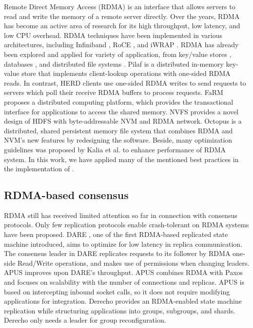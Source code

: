 Remote Direct Memory Access (RDMA) \cite{kalia2016design} is an interface that
allows servers to read and write the memory of a remote server directly. Over
the years, RDMA has become an active area of research for its high throughput,
low latency, and low CPU overhead. RDMA techniques have been implemented in
various architectures, including Infiniband \cite{pfister2001introduction}, RoCE
\cite{beck2011performance}, and iWRAP \cite{rashti200710}. RDMA has already been
explored and applied for variety of application, from key/value stores
\cite{FaRM, kalia2014using, mitchell2013using, wei2015fast}, databases
\cite{binnig2015end, huang2019rdma}, and distributed file systems
\cite{islam2012high, li2009early, wu2003pvfs}. Pilaf \cite{mitchell2013using} is
a distributed in-memory key-value store that implements client-lookup operations
with one-sided RDMA reads. In contrast, HERD \cite{kalia2014using} clients use
one-sided RDMA writes to send requests to servers which poll their receive RDMA
buffers to process requests. FaRM \cite{FaRM} proposes a distributed computing
platform, which provides the transactional interface for applications to access
the shared memory. NVFS \cite{islam2012high} provides a novel design of HDFS
with byte-addressable NVM and RDMA network. Octopus \cite{lu2017octopus} is a
distributed, shared persistent memory file system that combines RDMA and NVM's
new features by redesigning the software. Beside, many optimization guidelines
was proposed by Kalia et al. \cite{kalia2016design} to enhance performance of
RDMA system. In this work, we have applied many of the mentioned best practices
in the implementation of \libname.


\subsection{RDMA-based consensus}
\label{sec:rwrdmacons}

RDMA still has received limited attention so far in connection with consensus
protocols. Only few replication protocols enable crash-tolerant on RDMA systems
have been proposed. DARE \cite{DARE}, one of the first RDMA-based replicated
state machine introduced, aims to optimize for low latency in replica
communication. The consensus leader in DARE replicates requests to its follower
by RDMA one-side Read/Write operations, and makes use of permissions when
changing leaders. APUS \cite{APUS} improves upon DARE’s throughput. APUS
combines RDMA with Paxos and focuses on scalability with the number of
connections and replicas. APUS is based on intercepting inbound socket calls, so
it does not require modifying applications for integration. Derecho
\cite{jha2019derecho} provides an RDMA-enabled state machine replication while
structuring applications into groups, subgroups, and shards. Derecho only needs
a leader for group reconfiguration. 

